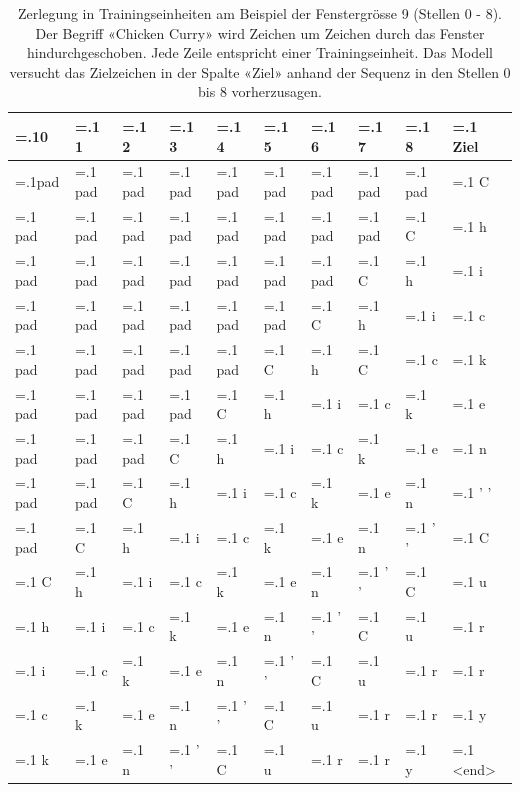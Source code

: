 \begin{table}
    \centering
    \footnotesize
    \begin{tabularx}{0.75\textwidth}{|>{\hsize=.1\hsize}X|>{\hsize=.1\hsize}X|>{\hsize=.1\hsize}X|>{\hsize=.1\hsize}X|>{\hsize=.1\hsize}X|>{\hsize=.1\hsize}X|>{\hsize=.1\hsize}X|>{\hsize=.1\hsize}X|>{\hsize=.1\hsize}X||>{\hsize=.1\hsize}X|}
    \hline
    \textbf{0} & \textbf{1} & \textbf{2} & \textbf{3} & \textbf{4} & \textbf{5} & \textbf{6} & \textbf{7} & \textbf{8} & \textbf{Ziel} \\\hline
            pad & pad & pad & pad & pad & pad & pad & pad & pad & C \\\hline
            pad & pad & pad & pad & pad & pad & pad & pad & C & h \\\hline
            pad & pad & pad & pad & pad & pad & pad & C & h & i \\\hline
            pad & pad & pad & pad & pad & pad & C & h & i & c \\\hline
            pad & pad & pad & pad & pad & C & h & C & c & k \\\hline
            pad & pad & pad & pad & C & h & i & c & k & e \\\hline
            pad & pad & pad & C & h & i & c & k & e & n \\\hline
            pad & pad & C & h & i & c & k & e & n & ' ' \\\hline
            pad & C & h & i & c & k & e & n & ' ' & C \\\hline
            C & h & i & c & k & e & n & ' ' & C & u \\\hline
            h & i & c & k & e & n & ' ' & C & u & r \\\hline
            i & c & k & e & n & ' ' & C & u & r & r \\\hline
            c & k & e & n & ' ' & C & u & r & r & y \\\hline
            k & e & n & ' ' & C & u & r & r & y & <end> \\\hline

    \end{tabularx}
    \caption{Zerlegung in Trainingseinheiten am Beispiel der Fenstergrösse 9 (Stellen 0 - 8).
    Der Begriff «Chicken Curry» wird Zeichen um Zeichen durch das Fenster hindurchgeschoben.
    Jede Zeile entspricht einer Trainingseinheit.
    Das Modell versucht das Zielzeichen in der Spalte «Ziel» anhand der Sequenz in den Stellen 0 bis 8 vorherzusagen.}
    \label{tab:splitting-into-training-units}

\end{table}

